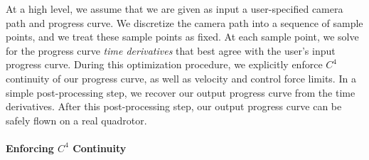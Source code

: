 At a high level, we assume that we are given as input a user-specified camera path and progress curve. We discretize the camera path into a sequence of sample points, and we treat these sample points as fixed.
At each sample point, we solve for the progress curve \emph{time derivatives} that best agree with the user's input progress curve.
During this optimization procedure, we explicitly enforce $C^4$ continuity of our progress curve, as well as velocity and control force limits.
In a simple post-processing step, we recover our output progress curve from the time derivatives.
After this post-processing step,  our output progress curve can be safely flown on a real quadrotor.



\paragraph{Enforcing $C^4$ Continuity}

